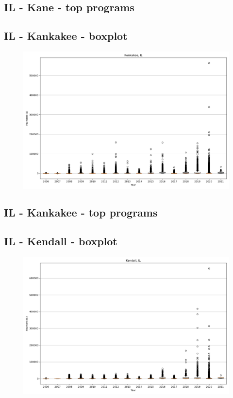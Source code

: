 \subsection*{IL - Kane - top programs}

\newpage
\subsection*{IL - Kankakee - boxplot}
\begin{figure}[h]
\centering
\includegraphics[width=7in]{../output/boxplots/counties/Kankakee-IL_boxplot.png}
\end{figure}


\subsection*{IL - Kankakee - top programs}

\newpage
\subsection*{IL - Kendall - boxplot}
\begin{figure}[h]
\centering
\includegraphics[width=7in]{../output/boxplots/counties/Kendall-IL_boxplot.png}
\end{figure}


